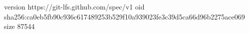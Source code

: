 version https://git-lfs.github.com/spec/v1
oid sha256:ca0eb5fb90c936c617489253b529f10a939023fe3c39d5ca66d96b2275ace069
size 87544
